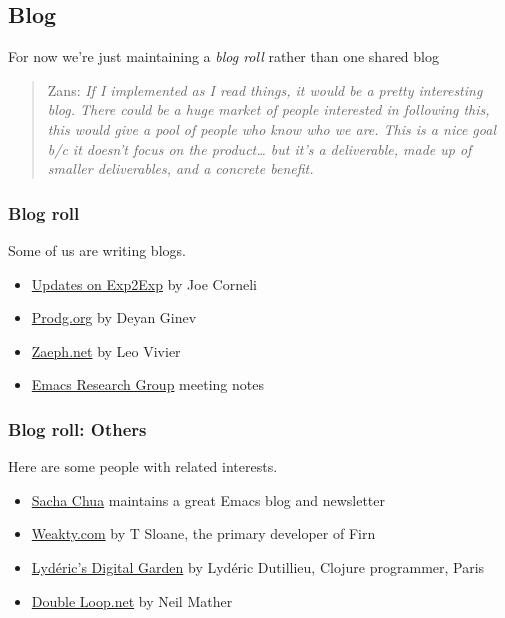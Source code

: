 \documentclass[11pt]{article}
\begin{document}
\subsection{Blog}
\label{sec:org098f971}
For now we’re just maintaining a \emph{blog roll} rather than one shared blog

\begin{quote}
Zans: \emph{If I implemented as I read things, it would be a pretty interesting blog. There could be a huge market of people interested in following this, this would give a pool of people who know who we are. This is a nice goal b/c it doesn't focus on the product\ldots{} but it's a deliverable, made up of smaller deliverables, and a concrete benefit.}
\end{quote}

\subsubsection{Blog roll}
\label{sec:org5e47cb5}

Some of us are writing blogs.

\begin{itemize}
\item \href{https://exp2exp.github.io/updates}{Updates on Exp2Exp} by Joe Corneli
\item \href{https://prodg.org/blog}{Prodg.org} by Deyan Ginev
\item \href{https://zaeph.net/posts/}{Zaeph.net} by Leo Vivier
\item \href{https://exp2exp.github.io/erg}{Emacs Research Group} meeting notes
\end{itemize}

\subsubsection{Blog roll: Others}
\label{sec:orga58b335}

Here are some people with related interests.

\begin{itemize}
\item \href{https://sachachua.com/blog/}{Sacha Chua} maintains a great Emacs blog and newsletter
\item \href{https://weakty.com/chronolog}{Weakty.com} by T Sloane, the primary developer of Firn
\item \href{https://lyderic.origenial.fr/}{Lydéric's Digital Garden} by Lydéric Dutillieu, Clojure programmer, Paris
\item \href{https://doubleloop.net/}{Double Loop.net} by Neil Mather
\end{itemize}
\end{document}
